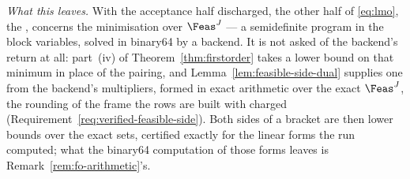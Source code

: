 \begin{remark}
\emph{What this leaves.} With the acceptance half discharged, the other
half of \eqref{eq:lmo}, the , concerns the
minimisation over $\Feas^{J}$ --- a semidefinite program in the block
variables, solved in binary64 by a backend. It is not asked of the backend's
return at all: part~(iv) of Theorem~\ref{thm:firstorder} takes a lower
bound on that minimum in place of the pairing, and
Lemma~\ref{lem:feasible-side-dual} supplies one from the backend's
multipliers, formed in exact arithmetic over the exact $\Feas^{J}$, the
rounding of the frame the rows are built with charged
(Requirement~\ref{req:verified-feasible-side}). Both sides of a bracket are
then lower bounds over the exact sets, certified exactly for the linear
forms the run computed; what the binary64 computation of those forms
leaves is Remark~\ref{rem:fo-arithmetic}'s.
\end{remark}
